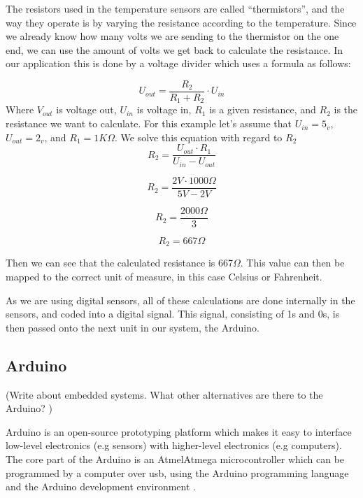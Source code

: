 The resistors used in the temperature sensors are called “thermistors”, and the way they operate is by varying the resistance according to the temperature. Since we already know how many volts we are sending to the thermistor on the one end, we can use the amount of volts we get back to calculate the resistance. In our application this is done by a voltage divider which uses a formula as follows: 

\begin{equation}
U_{out}=\frac{R_{2}}{R_{1}+R_{2}}\cdot U_{in} 
\label{eq:vdiv1}
\end{equation}
Where $V_{out}$ is voltage out, $U_{in}$ is voltage in, $R_{1}$ is a given resistance, and $R_{2}$ is the resistance we want to calculate. For this example let's assume that $U_{in} = 5_{v}$, $U_{out} = 2_{v}$, and $R_{1} = 1K\Omega$. We solve this equation with regard to $R_{2}$
\begin{equation}
R_{2} = \frac{U_{out} \cdot R_{1}}{U_{in}-U_{out}}
\end{equation} 

\begin{equation}
R_{2} = \frac{2V \cdot 1000\Omega}{5V-2V}
\end{equation} 

\begin{equation}
R_{2} = \frac{2000\Omega}{3}
\end{equation} 

\begin{equation}
R_{2} = 667\Omega
\end{equation} 

Then we can see that the calculated resistance is 667$\Omega$. This value can then be mapped to the correct unit of measure, in this case Celsius or Fahrenheit. 

As we are using digital sensors, all of these calculations are done internally in the sensors, and coded into a digital signal. This signal, consisting of 1s and 0s, is then passed onto the next unit in our system, the Arduino.  

\subsection{Arduino}
(Write about embedded systems. What other alternatives are there to the Arduino? )

Arduino is an open-source prototyping platform which makes it easy to interface low-level electronics (e.g sensors) with higher-level electronics (e.g computers). The core part of the Arduino is an Atmel\texttrademark Atmega microcontroller which can be programmed by a computer over usb, using the Arduino programming language and the Arduino development environment \citep{arduino}.

